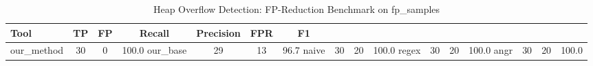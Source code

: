 \begin{table}[htbp]
  \centering
  \caption{Heap Overflow Detection: FP-Reduction Benchmark on fp\_samples}
  \label{tab:fp-benchmark}
  \begin{tabular}{lcccccc}
    \toprule
    \textbf{Tool} & \textbf{TP} & \textbf{FP} & \textbf{Recall} & \textbf{Precision} & \textbf{FPR} & \textbf{F1} \\
    \midrule
    our_method & 30 & 0 & 100.0%
    our_base & 29 & 13 & 96.7%
    naive & 30 & 20 & 100.0%
    regex & 30 & 20 & 100.0%
    angr & 30 & 20 & 100.0%
    \bottomrule
  \end{tabular}
\end{table}